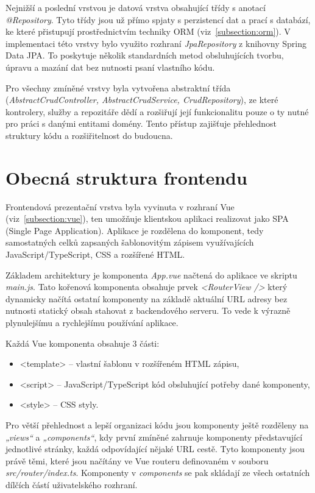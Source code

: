 Nejnižší a poslední vrstvou je datová vrstva obsahující třídy s anotací \textit{@Repository}.
Tyto třídy jsou už přímo spjaty s perzistencí dat a prací s databází, ke které přistupují
prostřednictvím techniky ORM (viz~\ref{subsection:orm}). V implementaci této vrstvy
bylo využito rozhraní \textit{JpaRepository} z knihovny Spring Data JPA. To poskytuje
několik standardních metod obsluhujících tvorbu, úpravu a mazání dat 
bez nutnosti psaní vlastního kódu.

Pro všechny zmíněné vrstvy byla vytvořena abstraktní třída (\textit{AbstractCrudController, AbstractCrudService, CrudRepository}), ze které kontrolery, služby a 
repozitáře dědí a rozšiřují její funkcionalitu pouze o ty nutné pro práci
s danými entitami domény. Tento přístup zajišťuje přehlednost struktury kódu a rozšiřitelnost do budoucna.

\section{Obecná struktura frontendu}
Frontendová prezentační vrstva byla vyvinuta v rozhraní Vue (viz~\ref{subsection:vue}), ten umožňuje klientskou aplikaci
realizovat jako SPA (Single Page Application). Aplikace je rozdělena do komponent, tedy
samostatných celků zapsaných šablonovitým zápisem využívajících JavaScript/TypeScript, CSS a 
rozšířené HTML.

Základem architektury je komponenta \textit{App.vue} načtená do aplikace ve skriptu \textit{main.js}.
Tato kořenová komponenta obsahuje prvek \textit{<RouterView />} který dynamicky načítá ostatní komponenty
na základě aktuální URL adresy bez nutnosti statický obsah stahovat z backendového serveru. To vede k výrazně
plynulejšímu a rychlejšímu používání aplikace.

Každá Vue komponenta obsahuje 3 části:
\begin{itemize}
    \item <template> – vlastní šablonu v rozšířeném HTML zápisu,
    \item <script> – JavaScript/TypeScript kód obsluhující potřeby dané komponenty, 
    \item <style> – CSS styly.
\end{itemize}

Pro větší přehlednost a lepší organizaci kódu jsou komponenty ještě rozděleny na \textit{„views“} a \textit{„components“},
kdy první zmíněné zahrnuje komponenty představující jednotlivé stránky, každá odpovídající nějaké URL cestě.
Tyto komponenty jsou právě těmi, které jsou načítány ve Vue routeru definovaném v souboru \textit{src/router/index.ts}.
Komponenty v \textit{components} se pak skládají ze všech ostatních dílčích částí uživatelského rozhraní. 

